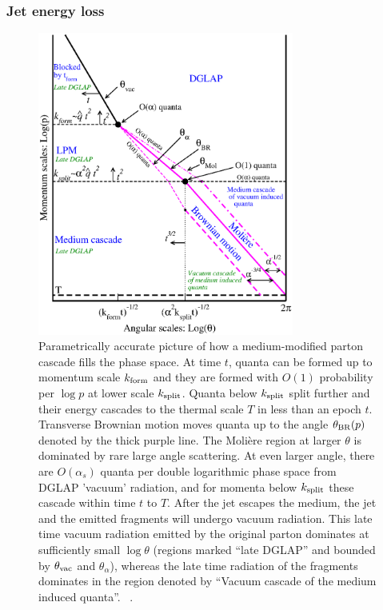 \subsubsection{Jet energy loss}
\begin{figure}
\centering
\includegraphics[width=0.75\textwidth]{figures/regions4.eps}
\caption[]{Parametrically accurate picture of how a medium-modified parton cascade fills the phase space. At time $t$, quanta can be formed up to momentum scale $k_{\rm form}$ and they are formed with $O(1)$ probability per $\log p$ at lower scale $k_{\rm split}$. Quanta below $k_{\rm split}$ split further and their energy cascades to the thermal scale $T$ in less than an epoch $t$. Transverse Brownian motion moves quanta up to the angle $\theta_{\rm BR}(p)$ denoted by the thick purple line.  The Moli\`ere region at larger $\theta$ is dominated by rare large angle scattering. At even larger angle, there are $O(\alpha_s)$ quanta per double logarithmic phase space  from DGLAP 'vacuum' radiation, and for momenta below $k_{\rm split}$ these cascade within time $t$ to $T$. After the jet escapes the medium, the jet and the emitted fragments will undergo vacuum radiation. This late time vacuum radiation emitted by the original parton dominates at sufficiently small $\log \theta$  (regions marked ``late DGLAP'' and bounded by $\theta_{\rm vac}$ and $\theta_\alpha$),  whereas the late time radiation of the fragments dominates in the region  denoted by ``Vacuum cascade of the medium induced quanta''. ~\cite{Kurkela:2014tla}. }
\label{fig:cascades}
\end{figure}

